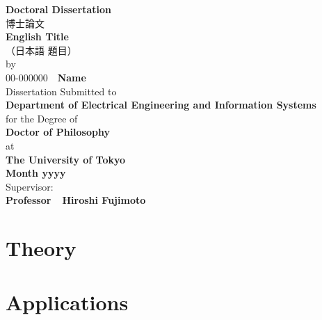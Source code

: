 \documentclass[platex,ja=standard,12pt,a4paper,twoside,onecolumn,fleqn,dvipdfmx,english]{bxjsbook}
\begin{document}
\thispagestyle{empty}
\begin{center}
{\LARGE{\textbf{Doctoral Dissertation}}}\\
\medskip
{\LARGE{博士論文}}\\
\bigskip
\bigskip
\bigskip
{\LARGE{\textbf{English Title}}}\\
\bigskip
{\LARGE{（日本語 題目）}}\\
\bigskip
{\Large{by}}\\
\bigskip
{\LARGE{{00-000000}\ \ \textbf{Name}}}\\
\bigskip
\bigskip
\bigskip
{\large{Dissertation Submitted to}}\\
\medskip
{\large{\textbf{Department of Electrical Engineering and Information Systems}}}\\
\medskip
{\large{for the Degree of}}\\
\medskip
{\large{\textbf{Doctor of Philosophy}}}\\
\medskip
{\large{at}}\\
\medskip
{\large{\textbf{The University of Tokyo}}}\\
\bigskip
\bigskip
\bigskip
{\large{\textbf{Month yyyy}}}\\
\bigskip
\bigskip
\bigskip
{\large{Supervisor:}}\\
\medskip
{\large{\textbf{Professor\ \ Hiroshi Fujimoto}}}
\end{center}

\frontmatter




\tableofcontents
\listoffigures
\listoftables

\mainmatter



\part{Theory}



\part{Applications}





\backmatter








\printindex
\end{document}
